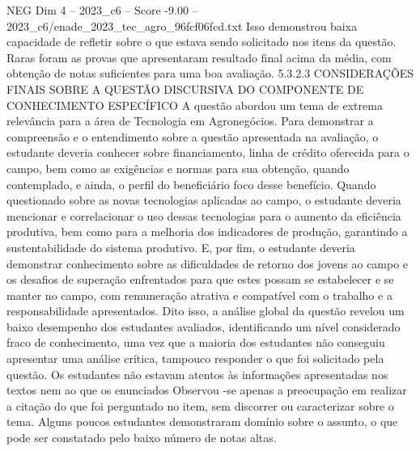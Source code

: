 \begin{textsample}{NEG Dim 4 – 2023\_c6 – Score -9.00 – 2023\_c6/enade\_2023\_tec\_agro\_96fcf06fcd.txt}
Isso demonstrou baixa capacidade de refletir sobre o que estava sendo solicitado nos itens da questão.
Raras foram as provas que apresentaram resultado final acima da média, com obtenção de notas suficientes para uma boa avaliação. 5.3.2.3 CONSIDERAÇÕES FINAIS SOBRE A QUESTÃO DISCURSIVA DO COMPONENTE DE CONHECIMENTO ESPECÍFICO A questão abordou um tema de extrema relevância para a área de Tecnologia em Agronegócios.
Para demonstrar a compreensão e o entendimento sobre a questão apresentada na avaliação, o estudante deveria conhecer sobre financiamento, linha de crédito oferecida para o campo, bem como as exigências e normas para sua obtenção, quando contemplado, e ainda, o perfil do beneficiário foco desse benefício.
Quando questionado sobre as novas tecnologias aplicadas ao campo, o estudante deveria mencionar e correlacionar o uso dessas tecnologias para o aumento da eficiência produtiva, bem como para a melhoria dos indicadores de produção, garantindo a sustentabilidade do sistema produtivo.
E, por fim, o estudante deveria demonstrar conhecimento sobre as dificuldades de retorno dos jovens ao campo e os desafios de superação enfrentados para que estes possam se estabelecer e se manter no campo, com remuneração atrativa e compatível com o trabalho e a responsabilidade apresentados.
Dito isso, a análise global da questão revelou um baixo desempenho dos estudantes avaliados, identificando um nível considerado fraco de conhecimento, uma vez que a maioria dos estudantes não conseguiu apresentar uma análise crítica, tampouco responder o que foi solicitado pela questão.
Os estudantes não estavam atentos às informações apresentadas nos textos nem ao que os enunciados Observou -se apenas a preocupação em realizar a citação do que foi perguntado no item, sem discorrer ou caracterizar sobre o tema.
Alguns poucos estudantes demonstraram domínio sobre o assunto, o que pode ser constatado pelo baixo número de notas altas.

\end{textsample}
